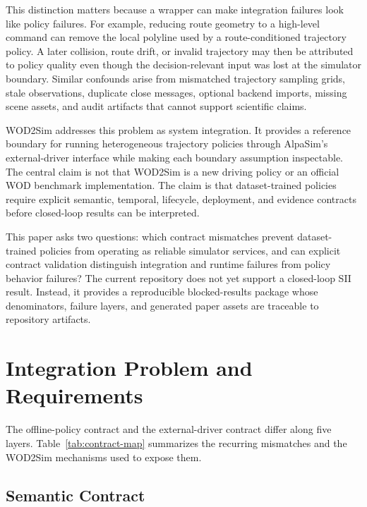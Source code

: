 \documentclass[conference,a4paper]{IEEEtran}
\begin{document}
This distinction matters because a wrapper can make integration failures look like
policy failures. For example, reducing route geometry to a high-level command can remove
the local polyline used by a route-conditioned trajectory policy. A later collision,
route drift, or invalid trajectory may then be attributed to policy quality even though
the decision-relevant input was lost at the simulator boundary. Similar confounds arise
from mismatched trajectory sampling grids, stale observations, duplicate close messages,
optional backend imports, missing scene assets, and audit artifacts that cannot support
scientific claims.

WOD2Sim addresses this problem as system integration. It provides a reference boundary
for running heterogeneous trajectory policies through AlpaSim's external-driver
interface while making each boundary assumption inspectable. The central claim is not
that WOD2Sim is a new driving policy or an official WOD benchmark implementation. The
claim is that dataset-trained policies require explicit semantic, temporal, lifecycle,
deployment, and evidence contracts before closed-loop results can be interpreted.

This paper asks two questions: which contract mismatches prevent dataset-trained
policies from operating as reliable simulator services, and can explicit contract
validation distinguish integration and runtime failures from policy behavior failures?
The current repository does not yet support a closed-loop SII result. Instead, it
provides a reproducible blocked-results package whose denominators, failure layers, and
generated paper assets are traceable to repository artifacts.

\section{Integration Problem and Requirements}

The offline-policy contract and the external-driver contract differ along five layers.
Table~\ref{tab:contract-map} summarizes the recurring mismatches and the WOD2Sim
mechanisms used to expose them.

\begin{table}[t]
\centering
\caption{Contract map for integrating WOD-style trajectory policies into distributed closed-loop simulation.}
\label{tab:contract-map}
\resizebox{\columnwidth}{!}{}
\end{table}

\subsection{Semantic Contract}
\end{document}
